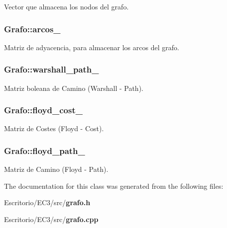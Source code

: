 Vector que almacena los nodos del grafo. 

\subsubsection{ {\bf Grafo::arcos\_\-}\hspace{0.3cm}{\tt  [private]}}\label{classGrafo_e330a15971717243fd7469f7e79f8ba0}


Matriz de adyacencia, para almacenar los arcos del grafo. 

\subsubsection{ {\bf Grafo::warshall\_\-path\_\-}\hspace{0.3cm}{\tt  [private]}}\label{classGrafo_4f1d21e22a26e5e06878318a8b3d8b44}


Matriz boleana de Camino (Warshall - Path). 

\subsubsection{ {\bf Grafo::floyd\_\-cost\_\-}\hspace{0.3cm}{\tt  [private]}}\label{classGrafo_6122b3cf632d33f1cb5d385363ed8f4c}


Matriz de Costes (Floyd - Cost). 

\subsubsection{ {\bf Grafo::floyd\_\-path\_\-}\hspace{0.3cm}{\tt  [private]}}\label{classGrafo_d6d3d4c5e457e9f8b43de4a69001722e}


Matriz de Camino (Floyd - Path). 



The documentation for this class was generated from the following files:\begin{CompactItemize}
\item 
Escritorio/EC3/src/{\bf grafo.h}\item 
Escritorio/EC3/src/{\bf grafo.cpp}\end{CompactItemize}
